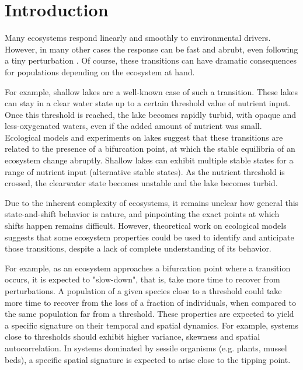 \documentclass{article}
\begin{document}
\section{Introduction}

Many ecosystems respond linearly and smoothly to environmental drivers. However, 
in many other cases the response can be fast and abrubt, even following a tiny 
perturbation \citep{scheffer2003a}. Of course, these transitions can have 
dramatic consequences for populations depending on the ecosystem at hand. 

For example, shallow lakes are a well-known case of such a transition. These 
lakes can stay in a clear water state up to a certain threshold value of 
nutrient input. Once this threshold is reached, the lake becomes rapidly turbid, 
with opaque and less-oxygenated waters, even if the added amount of nutrient was 
small. Ecological models and experiments on lakes suggest that these transitions 
are related to the presence of a bifurcation point, at which the stable 
equilibria of an ecosystem change abruptly. Shallow lakes can exhibit multiple 
stable states for a range of nutrient input (alternative stable states). As the 
nutrient threshold is crossed, the clearwater state becomes unstable and the 
lake becomes turbid.


Due to the inherent complexity of ecosystems, it remains unclear how general 
this state-and-shift behavior is nature, and pinpointing the exact points at 
which shifts happen remains difficult. However, theoretical work on ecological 
models suggests that some ecosystem properties could be used to identify and 
anticipate those transitions, despite a lack of complete understanding of its 
behavior. 

For example, as an ecosystem approaches a bifurcation point where a transition 
occurs, it is expected to "slow-down", that is, take more time to recover from 
perturbations. A population of a given species close to a threshold could take 
more time to recover from the loss of a fraction of individuals, when compared 
to the same population far from a threshold. These properties are expected to 
yield a specific signature on their temporal and spatial dynamics. For example, 
systems close to thresholds should exhibit higher variance, skewness and spatial 
autocorrelation. In systems dominated by sessile organisms (e.g. plants, mussel
beds), a specific spatial signature is expected to arise close to the tipping 
point. 
\end{document}
